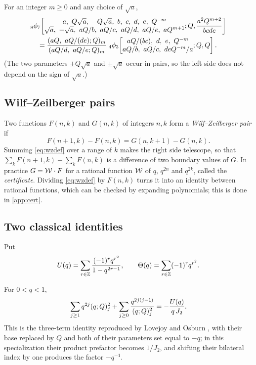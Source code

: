 \begin{fact}\label{fact:watson}
For an integer $m\ge0$ and any choice of $\sqrt a$,
\begin{multline*}
{}_8\phi_7\!\left[\begin{matrix}a,\ Q\sqrt a,\ -Q\sqrt a,\ b,\ c,\ d,\ e,\ Q^{-m}\\
\sqrt a,\ -\sqrt a,\ aQ/b,\ aQ/c,\ aQ/d,\ aQ/e,\ aQ^{m+1}\end{matrix};
Q,\frac{a^2Q^{m+2}}{bcde}\right]\\
=\frac{\poch{aQ,\ aQ/(de)}{Q}{m}}{\poch{aQ/d,\ aQ/e}{Q}{m}}\;
{}_4\phi_3\!\left[\begin{matrix}aQ/(bc),\ d,\ e,\ Q^{-m}\\
aQ/b,\ aQ/c,\ deQ^{-m}/a\end{matrix};Q,Q\right].
\end{multline*}
(The two parameters $\pm Q\sqrt a$ and $\pm\sqrt a$ occur in pairs, so the
left side does not depend on the sign of $\sqrt a$.)
\end{fact}

\subsection{Wilf--Zeilberger pairs}\label{sec:wz}
Two functions $F(n,k)$ and $G(n,k)$ of integers $n,k$ form a
\emph{Wilf--Zeilberger pair} if
\begin{equation}\label{eq:wzdef}
F(n+1,k)-F(n,k)=G(n,k+1)-G(n,k).
\end{equation}
Summing \eqref{eq:wzdef} over a range of $k$ makes the right side telescope,
so that $\sum_kF(n+1,k)-\sum_kF(n,k)$ is a difference of two boundary values of
$G$. In practice $G=\mathcal{W}\cdot F$ for a rational function $\mathcal{W}$ of $q$,
$q^{2n}$ and $q^{2k}$, called the \emph{certificate}. Dividing
\eqref{eq:wzdef} by $F(n,k)$ turns it into an identity between rational
functions, which can be checked by expanding polynomials; this is done in
\cref{app:cert}.

\subsection{Two classical identities}
Put
\[
U(q)=\sum_{r\in\mathbb{Z}}\frac{(-1)^rq^{r^2}}{1-q^{2r-1}},\qquad
\Theta(q)=\sum_{r\in\mathbb{Z}}(-1)^rq^{r^2}.
\]

\begin{fact}\label{fact:LO}
For $0<q<1$,
\[
\sum_{j\ge1}q^{2j}(q;Q)_{j}^2+\sum_{j\ge0}\frac{q^{2j(j-1)}}{(q;Q)_{j}^2}
=-\frac{U(q)}{q\,J_2}.
\]
This is the three-term identity reproduced by Lovejoy and Osburn
\cite[(3.11)]{LO}, with their base replaced by $Q$ and both of their parameters
set equal to $-q$; in this specialization their product prefactor becomes
$1/J_2$, and shifting their bilateral index by one produces the factor
$-q^{-1}$.
\end{fact}

